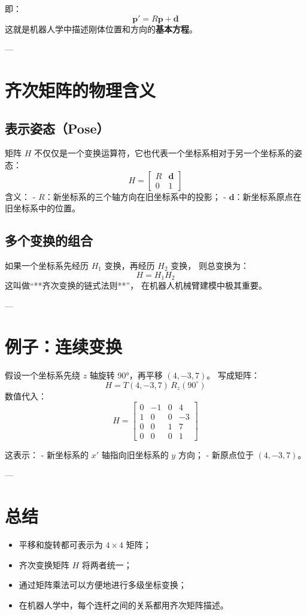 \documentclass[12pt,a4paper]{article}
\begin{document}
即：
\[
\boxed{
\boldsymbol{p}' = R\boldsymbol{p} + \boldsymbol{d}
}
\]
这就是机器人学中描述刚体位置和方向的\textbf{基本方程}。

---

\section{齐次矩阵的物理含义}
\subsection{表示姿态（Pose）}
矩阵 $H$ 不仅仅是一个变换运算符，它也代表一个坐标系相对于另一个坐标系的姿态：
\[
H =
\begin{bmatrix}
R & \boldsymbol{d} \\
0 & 1
\end{bmatrix}
\]
含义：
- \(R\)：新坐标系的三个轴方向在旧坐标系中的投影；
- \(\boldsymbol{d}\)：新坐标系原点在旧坐标系中的位置。

\subsection{多个变换的组合}
如果一个坐标系先经历 $H_1$ 变换，再经历 $H_2$ 变换，  
则总变换为：
\[
H = H_1 H_2
\]
这叫做“**齐次变换的链式法则**”，  
在机器人机械臂建模中极其重要。

---

\section{例子：连续变换}
假设一个坐标系先绕 $z$ 轴旋转 90°，再平移 $(4,-3,7)$。  
写成矩阵：
\[
H = T(4,-3,7)\,R_z(90^\circ)
\]
数值代入：
\[
H =
\begin{bmatrix}
0 & -1 & 0 & 4\\
1 & 0 & 0 & -3\\
0 & 0 & 1 & 7\\
0 & 0 & 0 & 1
\end{bmatrix}
\]

这表示：  
- 新坐标系的 $x'$ 轴指向旧坐标系的 $y$ 方向；  
- 新原点位于 $(4,-3,7)$。

---

\section{总结}
\begin{itemize}
  \item 平移和旋转都可表示为 \(4\times4\) 矩阵；
  \item 齐次变换矩阵 $H$ 将两者统一；
  \item 通过矩阵乘法可以方便地进行多级坐标变换；
  \item 在机器人学中，每个连杆之间的关系都用齐次矩阵描述。
\end{itemize}
\end{document}
